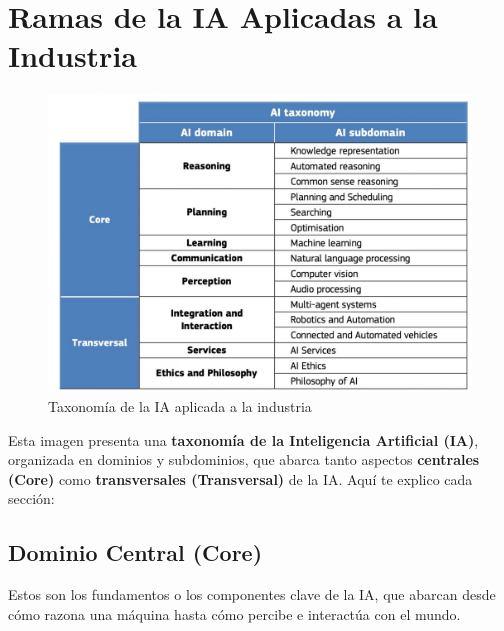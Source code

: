 \section{Ramas de la IA Aplicadas a la Industria}\label{ramas-de-la-ia-aplicadas-a-la-industria}

\begin{figure}[H]
\centering
\begin{adjustbox}{width=\textwidth}
\includegraphics{img/taxonomia.jpg}
\end{adjustbox}
\caption{Taxonomía de la IA aplicada a la industria}
\label{fig:taxonomia-ia}
\end{figure}

Esta imagen presenta una \textbf{taxonomía de la Inteligencia Artificial (IA)}, organizada en dominios y subdominios, que abarca tanto aspectos \textbf{centrales (Core)} como \textbf{transversales (Transversal)} de la IA. Aquí te explico cada sección:

\subsection{Dominio Central (Core)}\label{dominio-central-core}
Estos son los fundamentos o los componentes clave de la IA, que abarcan desde cómo razona una máquina hasta cómo percibe e interactúa con el mundo.

